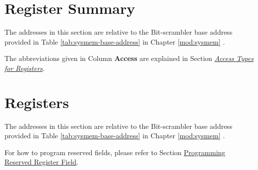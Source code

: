 \documentclass[main\_\_EN.tex]{subfiles}
\begin{document}


\newpage
\hypertarget{bitscrm-reg-summ}{}
\section{Register Summary}
\label{sec:bitscrm-reg-summ}

The addresses in this section are relative to the Bit-scrambler base address provided in Table \ref{tab:sysmem-base-address} in Chapter \ref{mod:sysmem} \textit{}.

The abbreviations given in Column \textbf{Access} are explained in Section \hyperref[glossary-access-types]{\textit{Access Types for Registers}}.






\newpage
\section{Registers}

The addresses in this section are relative to the Bit-scrambler base address provided in Table \ref{tab:sysmem-base-address} in Chapter \ref{mod:sysmem} \textit{}.

For how to program reserved fields, please refer to Section \hyperref[programming-reserved-field]{Programming Reserved Register Field}.


\end{document}
